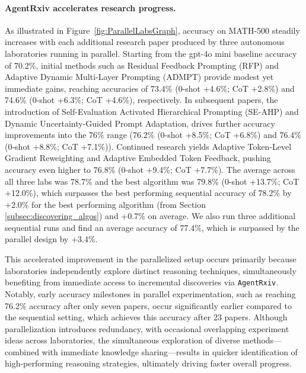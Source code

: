 \documentclass[11pt, a4paper]{include/gdm_format}
\begin{document}
\paragraph{AgentRxiv accelerates research progress.}
As illustrated in Figure~\ref{fig:ParallelLabsGraph}, accuracy on MATH-500 steadily increases with each additional research paper produced by three autonomous laboratories running in parallel. Starting from the gpt-4o mini baseline accuracy of 70.2\%, initial methods such as Residual Feedback Prompting (RFP) and Adaptive Dynamic Multi-Layer Prompting (ADMPT) provide modest yet immediate gains, reaching accuracies of 73.4\% (0-shot {\color{darkpastelgreen}+4.6\%}; CoT {\color{darkpastelgreen}+2.8\%}) and 74.6\% (0-shot {\color{darkpastelgreen}+6.3\%}; CoT {\color{darkpastelgreen}+4.6\%}), respectively. In subsequent papers, the introduction of Self-Evaluation Activated Hierarchical Prompting (SE-AHP) and Dynamic Uncertainty-Guided Prompt Adaptation, drives further accuracy improvements into the 76\% range (76.2\% (0-shot {\color{darkpastelgreen}+8.5\%}; CoT {\color{darkpastelgreen}+6.8\%}) and 76.4\% (0-shot {\color{darkpastelgreen}+8.8\%}; CoT {\color{darkpastelgreen}+7.1\%})). Continued research yields Adaptive Token-Level Gradient Reweighting and Adaptive Embedded Token Feedback, pushing accuracy even higher to 76.8\% (0-shot {\color{darkpastelgreen}+9.4\%}; CoT {\color{darkpastelgreen}+7.7\%}). The average across all three labs was 78.7\% and the best algorithm was 79.8\% (0-shot {\color{darkpastelgreen}+13.7\%}; CoT {\color{darkpastelgreen}+12.0\%}), which surpasses the best performing sequential accuracy of 78.2\% by {\color{darkpastelgreen}+2.0\%} for the best performing algorithm (from Section \ref{subsec:discovering_algos}) and {\color{darkpastelgreen}+0.7\%} on average. We also run three additional sequential runs and find an average accuracy of 77.4\%, which is surpassed by the parallel design by {\color{darkpastelgreen}+3.4\%}.

This accelerated improvement in the parallelized setup occurs primarily because laboratories independently explore distinct reasoning techniques, simultaneously benefiting from immediate access to incremental discoveries via \texttt{AgentRxiv}. Notably, early accuracy milestones in parallel experimentation, such as reaching 76.2\% accuracy after only seven papers, occur significantly earlier compared to the sequential setting, which achieves this accuracy after 23 papers. Although parallelization introduces redundancy, with occasional overlapping experiment ideas across laboratories, the simultaneous exploration of diverse methods—combined with immediate knowledge sharing—results in quicker identification of high-performing reasoning strategies, ultimately driving faster overall progress.
\end{document}
